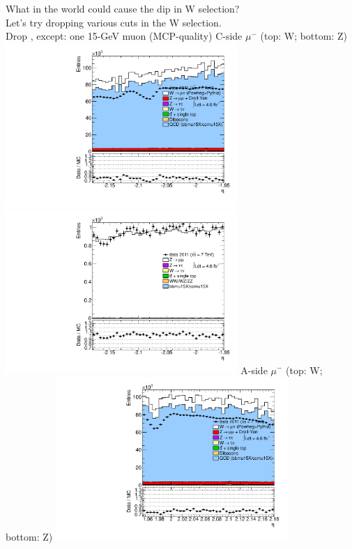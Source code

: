  {
What in the world could cause the dip in W selection? \\
Let's try dropping various cuts in the W selection. \\
Drop , except: one 15-GeV muon (MCP-quality)
}
 {
\colb[T]
C-side $\mu^{-}$ (top: W; bottom: Z)
\centering
\includegraphics[width=0.66\textwidth]{dates/20130306/figures/both/Wnocuts_10_C_stack_l_eta_NEG} \\
\includegraphics[width=0.66\textwidth]{dates/20130306/figures/both/Z_10_C_stack_lN_eta_ALL.pdf}
A-side $\mu^{-}$ (top: W; bottom: Z)
\centering
\includegraphics[width=0.66\textwidth]{dates/20130306/figures/both/Wnocuts_10_A_stack_l_eta_NEG} \\
}
